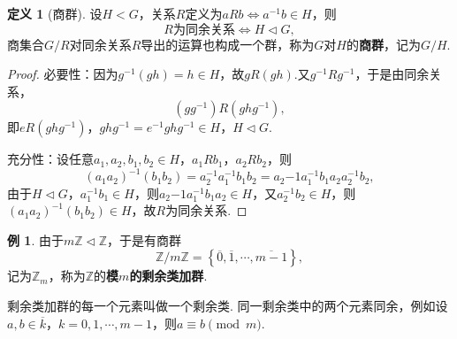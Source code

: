 \documentclass[12pt]{ctexart}
\theoremstyle{definition}
\newtheorem{definition}{定义}
\newtheorem{example}{例}
\theoremstyle{plain}
\begin{document}
	\begin{definition}[商群]
		设$H<G$，关系$R$定义为$aRb\iff a^{-1}b\in H$，则
		$$R\text{为同余关系}\iff H\vartriangleleft G,$$
		商集合$G/R$对同余关系$R$导出的运算也构成一个群，称为$G$对$H$的\textbf{商群}，记为$G/H$.
	\end{definition}
	\begin{proof}
		必要性：因为$g^{-1}(gh)=h\in H$，故$gR(gh)$.又$g^{-1}Rg^{-1}$，于是由同余关系，$$(gg^{-1})R(ghg^{-1}),$$即$eR(ghg^{-1})$，$ghg^{-1}=e^{-1}ghg^{-1}\in H$，$H\vartriangleleft G$.
		
		充分性：设任意$a_1,a_2,b_1,b_2\in H$，$a_1Rb_1$，$a_2Rb_2$，则
		$$(a_1a_2)^{-1}(b_1b_2)=a_2^{-1}a_1^{-1}b_1b_2=a_2{-1}a_1^{-1}b_1a_2a_2^{-1}b_2,$$
		由于$H\vartriangleleft G$，$a_1^{-1}b_1\in H$，则$a_2{-1}a_1^{-1}b_1a_2\in H$，又$a_2^{-1}b_2\in H$，则$(a_1a_2)^{-1}(b_1b_2)\in H$，故$R$为同余关系.
	\end{proof}
	\begin{example}
		由于$m\mathbb{Z}\vartriangleleft\mathbb{Z}$，于是有商群
		$$\mathbb{Z}/m\mathbb{Z}=\left\{\overline{0},\overline{1},\cdots,\overline{m-1}\right\},$$
		记为$\mathbb{Z}_m$，称为$\mathbb{Z}$的\textbf{模$m$的剩余类加群}.
	\end{example}
	剩余类加群的每一个元素叫做一个剩余类. 同一剩余类中的两个元素同余，例如设$a,b\in\overline{k}$，$k=0,1,\cdots,m-1$，则$a\equiv b\pmod m$. 
\end{document}
